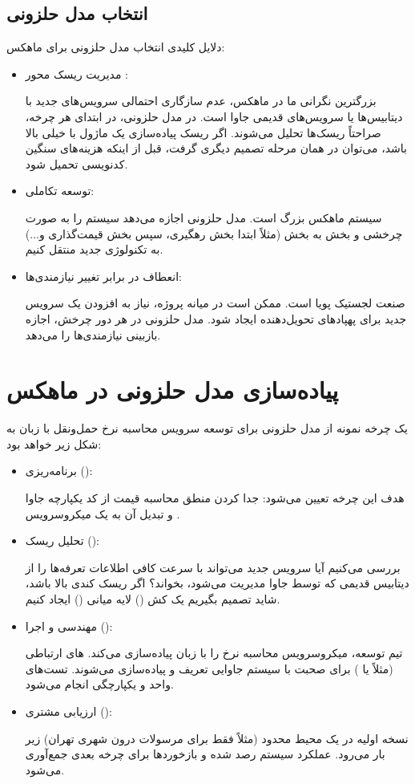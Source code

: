 \documentclass[12pt,a4paper]{report}
\begin{document}
\subsection{انتخاب مدل حلزونی}
دلایل کلیدی انتخاب مدل حلزونی برای ماهکس:
\begin{itemize}
	\item 
مدیریت ریسک محور :

 بزرگترین نگرانی ما در ماهکس، عدم سازگاری احتمالی سرویس‌های جدید  با دیتابیس‌ها یا سرویس‌های قدیمی جاوا است. در مدل حلزونی، در ابتدای هر چرخه، صراحتاً ریسک‌ها تحلیل می‌شوند. اگر ریسک پیاده‌سازی یک ماژول با  خیلی بالا باشد، می‌توان در همان مرحله تصمیم دیگری گرفت، قبل از اینکه هزینه‌های سنگین کدنویسی تحمیل شود.
\item 
توسعه تکاملی: 

سیستم ماهکس بزرگ است. مدل حلزونی اجازه می‌دهد سیستم را به صورت چرخشی و بخش به بخش (مثلاً ابتدا بخش رهگیری، سپس بخش قیمت‌گذاری و...) به تکنولوژی جدید منتقل کنیم.
\item 
انعطاف در برابر تغییر نیازمندی‌ها: 

صنعت لجستیک پویا است. ممکن است در میانه پروژه، نیاز به افزودن یک سرویس جدید برای پهپادهای تحویل‌دهنده ایجاد شود. مدل حلزونی در هر دور چرخش، اجازه بازبینی نیازمندی‌ها را می‌دهد.
\end{itemize}
 \section{پیاده‌سازی مدل حلزونی در ماهکس}
 
یک چرخه نمونه از مدل حلزونی برای توسعه سرویس محاسبه نرخ حمل‌ونقل با زبان  به شکل زیر خواهد بود:
\begin{itemize}
	\item 
برنامه‌ریزی ():

 هدف این چرخه تعیین می‌شود: جدا کردن منطق محاسبه قیمت از کد یکپارچه جاوا و تبدیل آن به یک میکروسرویس .
\item 
تحلیل ریسک (): 

بررسی می‌کنیم آیا سرویس جدید  می‌تواند با سرعت کافی اطلاعات تعرفه‌ها را از دیتابیس قدیمی  که توسط جاوا مدیریت می‌شود، بخواند؟ اگر ریسک کندی بالا باشد، شاید تصمیم بگیریم یک کش () لایه میانی () ایجاد کنیم.
\item 
مهندسی و اجرا ():

 تیم توسعه، میکروسرویس محاسبه نرخ را با زبان  پیاده‌سازی می‌کند. های ارتباطی (مثلاً  یا ) برای صحبت با سیستم جاوایی تعریف و پیاده‌سازی می‌شوند. تست‌های واحد و یکپارچگی انجام می‌شود.
\item 
ارزیابی مشتری ():

 نسخه اولیه در یک محیط محدود (مثلاً فقط برای مرسولات درون شهری تهران) زیر بار می‌رود. عملکرد سیستم رصد شده و بازخوردها برای چرخه بعدی جمع‌آوری می‌شود.
\end{itemize}
\end{document}
